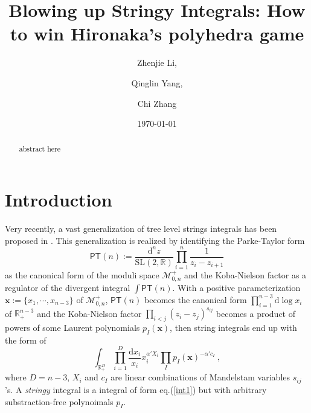 \documentclass[12pt]{article}
\date{\today}
\title{Blowing up Stringy Integrals: How to win Hironaka's polyhedra game}
\author{Zhenjie Li,\and Qinglin Yang,\and Chi Zhang}
\theoremstyle{definition}
\theoremstyle{plain}
\newcommand{\dif}{\mathrm{d}} %
\begin{document}
\maketitle

\begin{abstract}
	abstract here
\end{abstract}



\section{Introduction}

Very recently, a vast generalization of tree level strings integrals has been proposed in \cite{Arkani-Hamed:2019mrd}. This generalization is realized by identifying the Parke-Taylor form 
\[
	\mathsf{PT}(n):=\frac{\dif^{n}z}{\mathrm{SL}(2,\mathds{R})} \prod_{i=1}^{n}\frac{1}{z_{i}-z_{i+1}}
\]
as the canonical form of the moduli space $\mathcal{M}_{0,n}^{+}$ and the Koba-Nielson factor as a regulator of the divergent integral $\int \mathsf{PT}(n)$. With a positive parameterization  $\mathbf{x}:= \{x_{1},\cdots, x_{n-3}\}$  of $\mathcal{M}_{0,n}^{+}$, $\mathsf{PT}(n)$ becomes the canonical form $\prod_{i=1}^{n-3} \dif \log x_{i}$ of $\mathds{R}_{+}^{n-3}$ and the Koba-Nielson factor $\prod_{i<j} (z_{i}-z_{j})^{s_{ij}}$ becomes a product of powers of some Laurent polynomials $p_{I}(\mathbf{x})$, then string integrals end up with the form of
\begin{equation} 
	\int_{\mathds{R}_{+}^{D}} \prod_{i=1}^{D}\frac{\dif x_{i}}{x_{i}}x_{i}^{\alpha' X_{i}}\prod_{I}p_{I}(\mathbf{x})^{-\alpha'c_{I}}	\:, \label{int1}
\end{equation}
where $D=n{-}3$, $X_{i}$ and $c_{I}$ are linear combinations of Mandelstam variables $s_{ij}$'s. A \emph{stringy} integral is a integral of form eq.(\ref{int1}) but with arbitrary substraction-free polynoimals $p_{I}$. 

\end{document}
